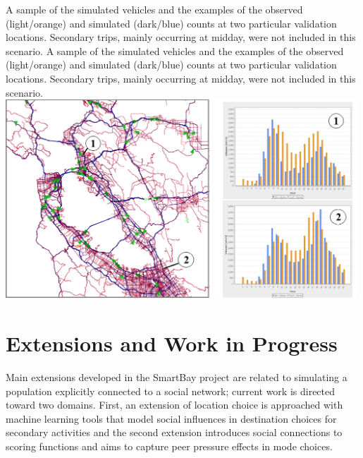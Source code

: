 \createfigure%
{A sample of the simulated vehicles and the examples of the observed (light/orange) and simulated (dark/blue) counts at two particular validation locations. Secondary trips, mainly occurring at midday, were not included in this scenario.}%
{A sample of the simulated vehicles and the examples of the observed (light/orange) and simulated (dark/blue) counts at two particular validation locations. Secondary trips, mainly occurring at midday, were not included in this scenario.}%
{\label{fig:sf_fig2}}%
{\includegraphics[width=0.99\textwidth, angle=0]{./scenarios/figures/sf_fig2.png}}%
{}

\section{Extensions and Work in Progress}
Main extensions developed in the SmartBay project are related to simulating a population explicitly connected to a social network; current work is directed toward two domains. First, an extension of location choice is approached with machine learning tools that model social influences in destination choices for secondary activities and the second extension introduces social connections to scoring functions and aims to capture peer pressure effects in mode choices.

